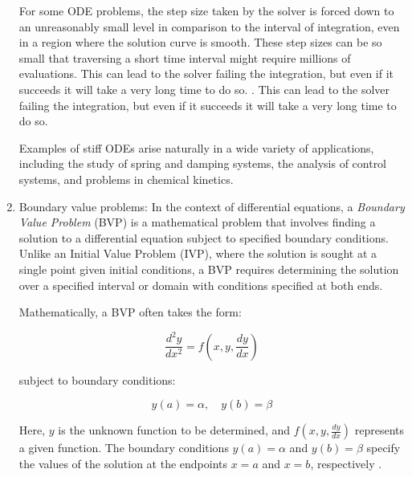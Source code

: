 \begin{enumerate}
    For some ODE problems, the step size taken by the solver is forced down to an unreasonably small level in comparison to the interval of integration, even in a region where the solution curve is smooth. These step sizes can be so small that traversing a short time interval might require millions of evaluations. This can lead to the solver failing the integration, but even if it succeeds it will take a very long time to do so. \cite{unknown-author-no-date}. This can lead to the solver failing the integration, but even if it succeeds it will take a very long time to do so.

    
    Examples of stiff ODEs arise naturally in a wide variety of applications, including the study of spring and damping systems, the analysis of control systems, and problems in chemical kinetics.


    \item Boundary value problems: In the context of differential equations, a \textit{Boundary Value Problem} (BVP) is a mathematical problem that involves finding a solution to a differential equation subject to specified boundary conditions. Unlike an Initial Value Problem (IVP), where the solution is sought at a single point given initial conditions, a BVP requires determining the solution over a specified interval or domain with conditions specified at both ends.

    Mathematically, a BVP often takes the form:
    
    \[ \frac{d^2y}{dx^2} = f(x, y, \frac{dy}{dx}) \]
    
    subject to boundary conditions:
    
    \[ y(a) = \alpha, \quad y(b) = \beta \]
    
    Here, \(y\) is the unknown function to be determined, and \(f(x, y, \frac{dy}{dx})\) represents a given function. The boundary conditions \(y(a) = \alpha\) and \(y(b) = \beta\) specify the values of the solution at the endpoints \(x = a\) and \(x = b\), respectively \cite{wiki-bvp}.
   

\end{enumerate}
